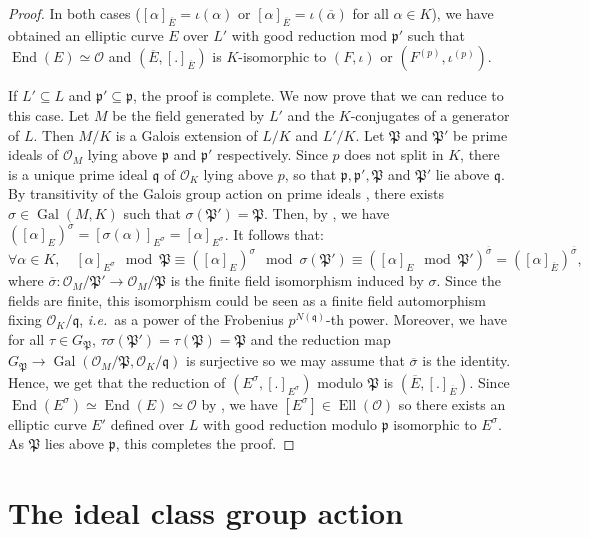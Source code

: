 \documentclass[a4paper,10pt,notitlepage]{report}
\theoremstyle{definition}
\theoremstyle{plain}
\theoremstyle{definition}
\newcommand{\ie}{\emph{i.e.}\ }
\newcommand{\mO}{\mathcal{O}}
\renewcommand{\(}{\left(}
\renewcommand{\)}{\right)}
\newcommand{\mf}[1]{\mathfrak{#1}}
\newcommand{\mfp}{\mathfrak{p}}
\newcommand{\mfq}{\mathfrak{q}}
\DeclareMathOperator{\End}{End}
\DeclareMathOperator{\Ell}{Ell}
\DeclareMathOperator{\Gal}{Gal}
\begin{document}
\begin{proof}
In both cases ($[\alpha]_{\overline{E}}=\iota(\alpha)$ or $[\alpha]_{\overline{E}}=\iota(\overline{\alpha})$ for all $\alpha\in K$), we have obtained an elliptic curve $E$ over $L'$ with good reduction mod $\mfp'$ such that $\End(E)\simeq \mO$ and $(\overline{E},[.]_{\overline{E}})$ is $K$-isomorphic to $(F,\iota)$ or $(F^{(p)},\iota^{(p)})$. 

If $L'\subseteq L$ and $\mfp'\subseteq\mfp$, the proof is complete. We now prove that we can reduce to this case. Let $M$ be the field generated by $L'$ and the $K$-conjugates of a generator of $L$. Then $M/K$ is a Galois extension of $L/K$ and $L'/K$.  Let $\mf{P}$ and $\mf{P}'$ be prime ideals of $\mO_M$ lying above $\mfp$ and $\mfp'$ respectively. Since $p$ does not split in $K$, there is a unique prime ideal $\mfq$ of $\mO_K$ lying above $p$, so that $\mfp, \mfp', \mf{P}$ and $\mf{P}'$ lie above $\mfq$. By transitivity of the Galois group action on prime ideals \cite[Proposition I.11]{Lang_ANT}, there exists $\sigma\in\Gal(M,K)$ such that $\sigma(\mf{P}')=\mf{P}$.  Then, by \cite[Theorem II.2.2.(a)]{Silverman2}, we have $([\alpha]_E)^\sigma=[\sigma(\alpha)]_{E^\sigma}=[\alpha]_{E^\sigma}$. It follows that:
\[\forall\alpha\in K, \quad [\alpha]_{E^\sigma} \mod\mf{P}\equiv ([\alpha]_E)^\sigma \mod\sigma(\mf{P}')\equiv \([\alpha]_E \mod\mf{P}'\)^{\overline{\sigma}}= ([\alpha]_{\overline{E}})^{\overline{\sigma}},\]
where $\overline{\sigma} :\mO_M/\mf{P}'\longrightarrow\mO_M/\mf{P}$ is the finite field isomorphism induced by $\sigma$. Since the fields are finite, this isomorphism could be seen as a finite field automorphism fixing $\mO_K/\mfq$, \ie as a power of the Frobenius $p^{N(\mfq)}$-th power. Moreover, we have for all $\tau\in G_{\mf{P}}$, $\tau\sigma(\mf{P}')=\tau(\mf{P})=\mf{P}$ and the reduction map $G_{\mf{P}}\longrightarrow\Gal(\mO_M/\mf{P},\mO_K/\mfq)$ is surjective so we may assume that $\overline{\sigma}$ is the identity.  Hence, 
we get that the reduction of $(E^{\sigma},[.]_{E^\sigma})$ modulo $\mf{P}$ is $(\overline{E},[.]_{\overline{E}})$. Since $\End(E^{\sigma})\simeq\End(E)\simeq \mO$ by \cite[Proposition II.2.1]{Silverman2}, we have $[E^\sigma]\in\Ell(\mO)$ so there exists an elliptic curve $E'$ defined over $L$ with good reduction modulo $\mfp$ isomorphic to $E^\sigma$.  As $\mf{P}$ lies above $\mfp$, this completes the proof.
\end{proof}

\section{The ideal class group action}
\end{document}
